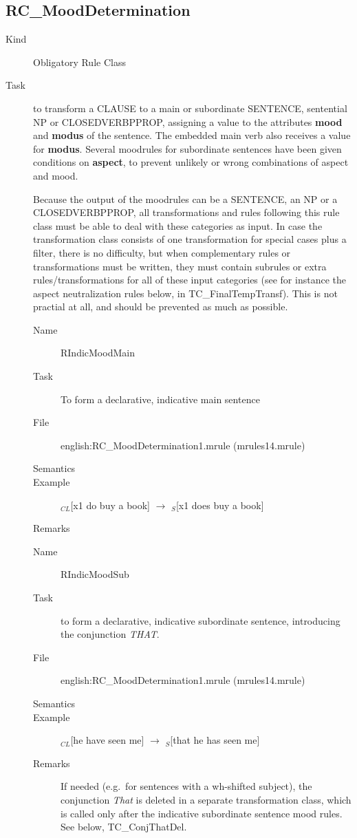 \subsection{RC\_MoodDetermination}
\begin{description}
\item[Kind] Obligatory Rule Class
\item[Task] to transform a CLAUSE to a main or subordinate SENTENCE, sentential 
NP or CLOSEDVERBPPROP, assigning
a value to the attributes {\bf mood} and {\bf modus} of the sentence. The 
embedded main verb also receives a value for {\bf modus}. Several moodrules for 
subordinate sentences have been given conditions on {\bf aspect}, to prevent 
unlikely or wrong combinations of aspect and mood.

Because the output of the moodrules can be a SENTENCE, an NP or a 
CLOSEDVERBPPROP, all transformations and rules following this rule class must
be able to deal with these categories as input. In case the transformation
class consists of one transformation for special cases plus a filter, there is
no difficulty, but when complementary rules or transformations must be written,
they must contain subrules or extra rules/transformations for all of these
input categories (see for instance the aspect neutralization rules below, in
TC\_FinalTempTransf). This is not practial at all, and should be prevented as 
much as possible.

\vspace{1 cm}
\begin{description}
\item[Name] RIndicMoodMain
\item[Task] To form a declarative, indicative main sentence
\item[File] english:RC\_MoodDetermination1.mrule (mrules14.mrule)
\item[Semantics]
\item[Example] $_{CL}$[x1 do buy a book] $\rightarrow$ $_S$[x1 does buy a book]
\item[Remarks]
\end{description}

\vspace{1 cm}
\begin{description}
\item[Name] RIndicMoodSub 
\item[Task] to form a declarative, indicative subordinate sentence, introducing 
the conjunction {\em THAT\/}.
\item[File] english:RC\_MoodDetermination1.mrule (mrules14.mrule)
\item[Semantics]
\item[Example] $_{CL}$[he have seen me] $\rightarrow$ $_S$[that he has seen me] 
\item[Remarks] If needed (e.g.\ for sentences with a wh-shifted subject),
the conjunction {\em That\/} is deleted in a separate 
transformation class, which is called only after the indicative subordinate 
sentence mood rules. 
See below, TC\_ConjThatDel.
\end{description}


\end{description}
